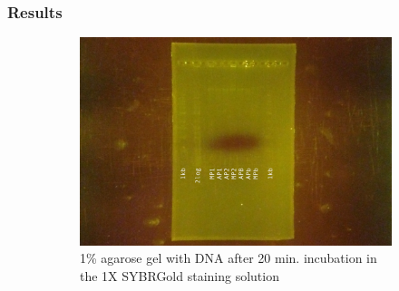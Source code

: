 \subsubsection{Results}

\begin{figure}[H] %
    \centering
    \caption{Pictures of the gels after migration}
    \label{fig:20180316_gel_sybr_gold}
    \begin{subfigure}[b]{0.479\textwidth}
        \includegraphics[width=\textwidth]{graphics/pic/20180316_gel_dna_sybr_gold1.JPG}
        \caption{1\% agarose gel with DNA after 20 min. incubation in the 1X SYBR\cR Gold staining solution}
        \label{sfig:20180316_gel_dna_sybr_gold1}
    \end{subfigure}
    ~ 
    \begin{subfigure}[b]{0.24\textwidth}

\end{subfigure}
\end{figure}
